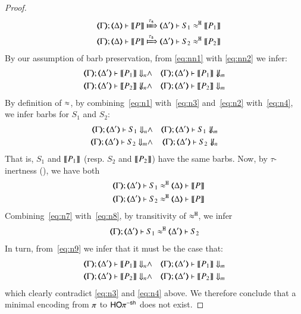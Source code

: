 \documentclass[preprint,11pt]{elsarticle}
\begin{document}
{\begin{proof}
\begin{eqnarray}
		& & \horel{\mapt{\Gamma}}{\mapt{\Delta}}{\map{P}}{\Hby{\stau}}{\mapt{\Delta'}}{S_1 \hwb \map{P_1}} \label{eq:n1} \\
		& & \horel{\mapt{\Gamma}}{\mapt{\Delta}}{\map{P}}{\Hby{\stau}}{\mapt{\Delta'}}{S_2 \hwb \map{P_2}} \label{eq:n2}
	\end{eqnarray}
	By our assumption of barb preservation, 
	from \eqref{eq:nn1} with \eqref{eq:nn2}
	we infer: 
	\begin{eqnarray}
		\mapt{\Gamma}; \mapt{\Delta'} \proves \map{P_1} \Barb{n} & \land & 
		\mapt{\Gamma}; \mapt{\Delta'} \proves \map{P_1} \nBarb{m} \label{eq:n3} \\
		\mapt{\Gamma}; \mapt{\Delta'} \proves \map{P_2} \nBarb{n}   & \land & 
		\mapt{\Gamma}; \mapt{\Delta'} \proves \map{P_2} \Barb{m} \label{eq:n4}
	\end{eqnarray}
	By definition of $\approx$, 
	by combining~\eqref{eq:n1} with~\eqref{eq:n3}
	and~\eqref{eq:n2} with~\eqref{eq:n4}, we infer barbs for $S_1$ and $S_2$:
	\begin{eqnarray}
		\mapt{\Gamma}; \mapt{\Delta'} \proves S_1 \Barb{n} & \land & 
		\mapt{\Gamma}; \mapt{\Delta'} \proves S_1 \nBarb{m} \label{eq:n5} \\
		\mapt{\Gamma}; \mapt{\Delta'} \proves S_2 \Barb{m} & \land & 
		\mapt{\Gamma}; \mapt{\Delta'} \proves S_2 \nBarb{n} \label{eq:n6}
	\end{eqnarray}
	That is, $S_1$ and $\llbracket P_1\rrbracket$ 
	(resp. $S_2$ and $\llbracket P_2\rrbracket$)
	have the same barbs.
	Now, by $\tau$-inertness (), we have both 
	\begin{eqnarray}
		& & \horel{\mapt{\Gamma}}{\mapt{\Delta'}}{S_1}{\hwb}{\mapt{\Delta}}{\map{P}} \label{eq:n7} \\
		& & \horel{\mapt{\Gamma}}{\mapt{\Delta'}}{S_2}{\hwb}{\mapt{\Delta}}{\map{P}} \label{eq:n8}
	\end{eqnarray}
	Combining~\eqref{eq:n7} with~\eqref{eq:n8}, by transitivity of $\approx^\mathtt{H}$,
	we infer
	\begin{equation}
		\horel{\mapt{\Gamma}}{\mapt{\Delta'}}{S_1}{\hwb}{\mapt{\Delta'}}{S_2} \label{eq:n9}
	\end{equation}
	In turn, from~\eqref{eq:n9}
	we infer that 
	it must be the case that:
	\begin{eqnarray*}
		\mapt{\Gamma}; \mapt{\Delta'} \proves \map{P_1} \Barb{n} & \land & 
		\mapt{\Gamma}; \mapt{\Delta'} \proves \map{P_1} \Barb{m} \label{eq:n10} \\
		\mapt{\Gamma}; \mapt{\Delta'} \proves \map{P_2} \Barb{n}  & \land & 
		 \mapt{\Gamma}; \mapt{\Delta'} \proves \map{P_2} \Barb{m} \label{eq:n11}
	\end{eqnarray*}
	which clearly contradict \eqref{eq:n3} and \eqref{eq:n4} above. 
	We therefore conclude that a minimal encoding from $\pi$ to $\mathsf{HO}\pi^{\mathsf{-sh}}$ does not exist.
\end{proof}

}
\end{document}
